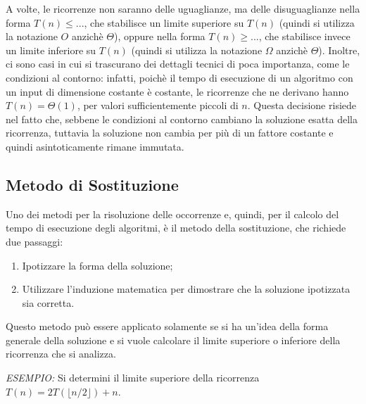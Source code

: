 A volte, le ricorrenze non saranno delle uguaglianze, ma delle disuguaglianze nella forma \(T(n) \le ...\), che stabilisce un limite superiore su \(T(n)\) (quindi si utilizza la notazione \(O\) anzichè \(\Theta\)), oppure nella forma \(T(n) \ge ...\), che stabilisce invece un limite inferiore su \(T(n)\) (quindi si utilizza la notazione \(\Omega\) anzichè \(\Theta\)). Inoltre, ci sono casi in cui si trascurano dei dettagli tecnici di poca importanza, come le condizioni al contorno: infatti, poichè il tempo di esecuzione di un algoritmo con un input di dimensione costante è costante, le ricorrenze che ne derivano hanno \(T(n)=\Theta(1)\), per valori sufficientemente piccoli di \(n\). Questa decisione risiede nel fatto che, sebbene le condizioni al contorno cambiano la soluzione esatta della ricorrenza, tuttavia la soluzione non cambia per più di un fattore costante e quindi asintoticamente rimane immutata.

\subsection{Metodo di Sostituzione}
Uno dei metodi per la risoluzione delle occorrenze e, quindi, per il calcolo del tempo di esecuzione degli algoritmi, è il metodo della sostituzione, che richiede due passaggi:
\begin{enumerate}
  \item Ipotizzare la forma della soluzione;
  \item Utilizzare l'induzione matematica per dimostrare che la soluzione ipotizzata sia corretta.
\end{enumerate}
Questo metodo può essere applicato solamente se si ha un'idea della forma generale della soluzione e si vuole calcolare il limite superiore o inferiore della ricorrenza che si analizza.

\textit{ESEMPIO:} Si determini il limite superiore della ricorrenza \(T(n)=2T(\lfloor n/2 \rfloor)+n\).

